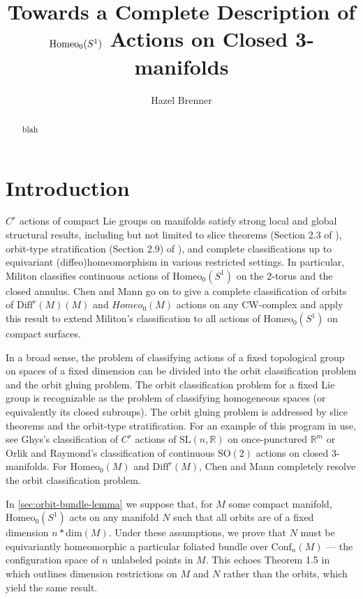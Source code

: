 \documentclass[10pt, oneside]{article}
\title{Towards a Complete Description of $\homeo$ Actions on Closed 3-manifolds}
\author{Hazel Brenner}
\newcommand{\R}{\mathbb{R}}
\newcommand{\SO}[1][2]{\text{SO}(#1)}
\newcommand{\homeo}[1][S^1]{\text{Homeo}_0(#1)}
\newcommand{\diffr}[1][M]{\text{Diff}^r(#1)}
\newcommand{\conf}[2][S^1]{\text{Conf}_{#2}(#1)}
\newcommand{\SL}[1][2]{\text{SL}(#1, \R)}
\theoremstyle{definition}
\theoremstyle{definition}
\begin{document}
\maketitle
\listoftodos
\tableofcontents
\begin{abstract}
    blah
\end{abstract}
\section{Introduction}\label{sec:intro}
$C^r$ actions of compact Lie groups on manifolds satisfy strong local and global structural results, including but not limited to slice theorems (Section 2.3 of \cite{duistermaat_lie_2000}), orbit-type stratification (Section 2.9) of \cite{duistermaat_lie_2000}), and complete classifications up to equivariant (diffeo)homeomorphism in various restricted settings. In particular, Militon \cite{militon_actions_2016} classifies continuous actions of $\homeo$ on the 2-torus and the closed annulus. Chen and Mann \cite{chen_structure_2023} go on to give a complete classification of orbits of $\diffr(M)$ and $Homeo_0(M)$ actions on any CW-complex and apply this result to extend Militon's classification to all actions of $\homeo$ on compact surfaces.

In a broad sense, the problem of classifying actions of a fixed topological group on spaces of a fixed dimension can be divided into the orbit classification problem and the orbit gluing problem. The orbit classification problem for a fixed Lie group is recognizable as the problem of classifying homogeneous spaces (or equivalently its closed subroups). The orbit gluing problem is addressed by slice theorems and the orbit-type stratification. For an example of this program in use, see Ghys's classification of $C^r$ actions of $\SL[n]$ on once-punctured $\R^m$\cite{cairns_local_1997} or Orlik and Raymond's classification of continuous $\SO$ actions on closed 3-manifolds\cite{orlik_actions_1968}. For $\homeo[M]$ and $\diffr$, Chen and Mann completely resolve the orbit classification problem. 

In \cref{sec:orbit-bundle-lemma} we suppose that, for $M$ some compact manifold, $\homeo$ acts on any manifold $N$ such that all orbits are of a fixed dimension $n*\text{dim}(M)$. Under these assumptions, we prove that $N$ must be equivariantly homeomorphic a particular foliated bundle over $\conf[M]{n}$ --- the configuration space of $n$ unlabeled points in $M$. This echoes Theorem 1.5 in \cite{chen_structure_2023} which outlines dimension restrictions on $M$ and $N$ rather than the orbits, which yield the same result.  
\end{document}
